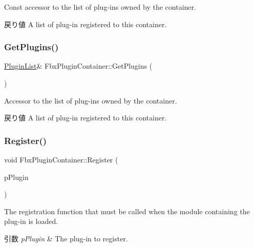 Const accessor to the list of plug-\/ins owned by the container. \begin{DoxyReturn}{戻り値}
A list of plug-\/in registered to this container. 
\end{DoxyReturn}
\mbox{\label{class_fbx_plugin_container_a7afab0ebbb775ef23ea541bec3adc301}} 
\subsubsection{\texorpdfstring{Get\+Plugins()}{GetPlugins()}\hspace{0.1cm}{\footnotesize\ttfamily [2/2]}}
{\footnotesize\ttfamily \hyperlink{class_fbx_plugin_container_a42abd8471efa91f56de2c4c64c220972}{Plugin\+List}\& Fbx\+Plugin\+Container\+::\+Get\+Plugins (\begin{DoxyParamCaption}{ }\end{DoxyParamCaption})}

Accessor to the list of plug-\/ins owned by the container. \begin{DoxyReturn}{戻り値}
A list of plug-\/in registered to this container. 
\end{DoxyReturn}
\mbox{\label{class_fbx_plugin_container_a3fc28ffe0296973afb3014112b4b0df0}} 
\subsubsection{\texorpdfstring{Register()}{Register()}}
{\footnotesize\ttfamily void Fbx\+Plugin\+Container\+::\+Register (\begin{DoxyParamCaption}\item[{\hyperlink{class_fbx_plugin}{Fbx\+Plugin} \&}]{p\+Plugin }\end{DoxyParamCaption})}

The registration function that must be called when the module containing the plug-\/in is loaded. 
\begin{DoxyParams}{引数}
{\em p\+Plugin} & The plug-\/in to register. \\
\hline
\end{DoxyParams}
\mbox{\label{class_fbx_plugin_container_af4b2068d41d0e87e97135e9effea55f7}} 
